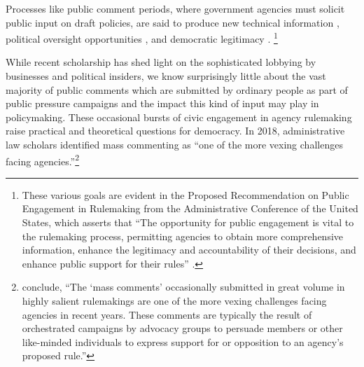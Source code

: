 \documentclass{article}
\begin{document}

Processes like public comment periods, where government agencies must solicit public input on draft policies, are said to produce new technical information \citep{Yackee2006JPART, Nelson2012}, political oversight opportunities \citep{Balla1998, Mccubbins1984}, and democratic legitimacy \citep{Croley2003, Rosenbloom2003}. %
\footnote{These various goals are evident in the Proposed Recommendation on Public Engagement in Rulemaking from the Administrative Conference of the United States, which asserts that ``The opportunity for public engagement is vital to the rulemaking process, permitting agencies to obtain more comprehensive information, enhance the legitimacy and accountability of their decisions, and enhance public support for their rules'' \citep{ACUS2018}.}

While recent scholarship has shed light on the sophisticated lobbying by businesses and political insiders, we know surprisingly little about the vast majority of public comments which are submitted by ordinary people as part of public pressure campaigns and the impact this kind of input may play in policymaking.  These occasional bursts of civic engagement in agency rulemaking raise practical and theoretical questions for democracy. In 2018, administrative law scholars identified mass commenting as ``one of the more vexing challenges facing agencies.''\footnote{\citet{SantAmbrogio2018} conclude, ``The `mass comments' occasionally submitted in great volume in highly salient rulemakings are one of the more vexing challenges facing agencies in recent years. These comments are typically the result of orchestrated campaigns by advocacy groups to persuade members or other like-minded individuals to express support for or opposition to an agency's proposed rule.''} 
\end{document}
